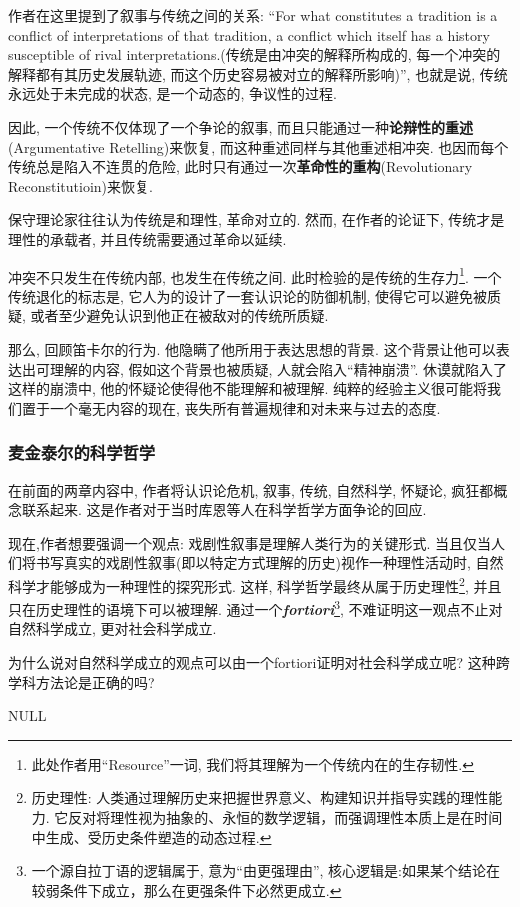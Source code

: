 \documentclass[12pt, a4paper, oneside]{ctexart}
\renewcommand{\b}{\textbf}
\newcommand{\f}{\footnote}
\newcommand{\q}[1]{\begin{questionbox}{}#1\end{questionbox}}
\newcommand{\ans}[1]{\begin{ansbox}{}#1\end{ansbox}}
\newcounter{question}[section]
\newcounter{ans}[section]
\begin{document}
作者在这里提到了叙事与传统之间的关系: ``For what constitutes a tradition is a conflict of interpretations of that tradition, a conflict which itself has a history susceptible of rival interpretations.(传统是由冲突的解释所构成的, 每一个冲突的解释都有其历史发展轨迹, 而这个历史容易被对立的解释所影响)'', 也就是说, 传统永远处于未完成的状态, 是一个动态的, 争议性的过程.

因此, 一个传统不仅体现了一个争论的叙事, 而且只能通过一种\b{论辩性的重述}(Argumentative Retelling)来恢复, 而这种重述同样与其他重述相冲突. 也因而每个传统总是陷入不连贯的危险, 此时只有通过一次\b{革命性的重构}(Revolutionary Reconstitutioin)来恢复.

保守理论家往往认为传统是和理性, 革命对立的. 然而, 在作者的论证下, 传统才是理性的承载者, 并且传统需要通过革命以延续. 

冲突不只发生在传统内部, 也发生在传统之间. 此时检验的是传统的生存力\f{此处作者用``Resource''一词, 我们将其理解为一个传统内在的生存韧性. }. 一个传统退化的标志是, 它人为的设计了一套认识论的防御机制, 使得它可以避免被质疑, 或者至少避免认识到他正在被敌对的传统所质疑. 

那么, 回顾笛卡尔的行为. 他隐瞒了他所用于表达思想的背景. 这个背景让他可以表达出可理解的内容, 假如这个背景也被质疑, 人就会陷入``精神崩溃''. 休谟就陷入了这样的崩溃中, 他的怀疑论使得他不能理解和被理解. 纯粹的经验主义很可能将我们置于一个毫无内容的现在, 丧失所有普遍规律和对未来与过去的态度. 

\subsubsection{麦金泰尔的科学哲学}

在前面的两章内容中, 作者将认识论危机, 叙事, 传统, 自然科学, 怀疑论, 疯狂都概念联系起来. 这是作者对于当时库恩等人在科学哲学方面争论的回应. 

现在,作者想要强调一个观点: 戏剧性叙事是理解人类行为的关键形式. 当且仅当人们将书写真实的戏剧性叙事(即以特定方式理解的历史)视作一种理性活动时, 自然科学才能够成为一种理性的探究形式. 这样, 科学哲学最终从属于历史理性\f{历史理性: 人类通过理解历史来把握世界意义、构建知识并指导实践的理性能力. 它反对将理性视为抽象的、永恒的数学逻辑，而强调理性本质上是在时间中生成、受历史条件塑造的动态过程. }, 并且只在历史理性的语境下可以被理解. 通过一个\textit{\b{fortiori}}\f{一个源自拉丁语的逻辑属于, 意为``由更强理由'', 核心逻辑是:如果某个结论在较弱条件下成立，那么在更强条件下必然更成立.}, 不难证明这一观点不止对自然科学成立, 更对社会科学成立.

\q{为什么说对自然科学成立的观点可以由一个fortiori证明对社会科学成立呢? 这种跨学科方法论是正确的吗? }
\ans{NULL}
\end{document}
